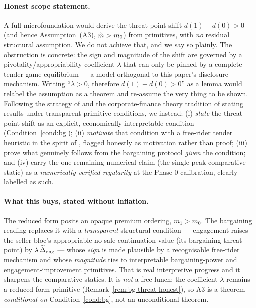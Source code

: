 \paragraph{Honest scope statement.}
A full microfoundation would derive the threat-point shift $d(1)-d(0)>0$ (and
hence Assumption~\textup{(A3)}, $\widetilde{m}>m_{0}$) from primitives, with \emph{no}
residual structural assumption. We do not achieve that, and we say so plainly.
The obstruction is concrete: the sign and magnitude of the shift are governed by
a pivotality/appropriability coefficient $\lambda$ that can only be pinned by a
complete tender-game equilibrium --- a model orthogonal to this paper's
disclosure mechanism. Writing ``$\lambda>0$, therefore $d(1)-d(0)>0$'' as a
lemma would relabel the assumption as a theorem and re-assume the very thing to
be shown. Following the strategy of \citet{EdmansGoldsteinJiang2015} and the
corporate-finance theory tradition of stating results under transparent
primitive conditions, we instead: (i) \emph{state} the threat-point shift as an
explicit, economically interpretable condition (Condition~\ref{cond:bg}); (ii)
\emph{motivate} that condition with a free-rider tender heuristic in the spirit
of \citet{GrossmanHart1980}, flagged honestly as motivation rather than proof;
(iii) prove what genuinely follows from the bargaining protocol \emph{given} the
condition; and (iv) carry the one remaining numerical claim (the single-peak
comparative static) as a \emph{numerically verified regularity} at the Phase-0
calibration, clearly labelled as such.

\paragraph{What this buys, stated without inflation.}
The reduced form posits an opaque premium ordering, $m_{1}>m_{0}$. The bargaining
reading replaces it with a \emph{transparent} structural condition --- engagement
raises the seller bloc's appropriable no-sale continuation value (its bargaining
threat point) by $\lambda\,\widetilde{\Delta}_{\mathrm{eng}}$ --- whose \emph{sign} is made
plausible by a recognisable free-rider mechanism and whose \emph{magnitude} ties
to interpretable bargaining-power and engagement-improvement primitives. That is
real interpretive progress and it sharpens the comparative statics. It is
\emph{not} a free lunch: the coefficient $\lambda$ remains a reduced-form
primitive (Remark~\ref{rem:bg-threat-honest}), so A3 is a theorem
\emph{conditional on} Condition~\ref{cond:bg}, not an unconditional theorem.

